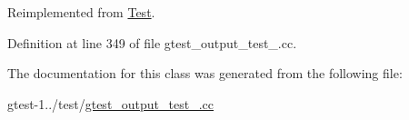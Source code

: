 \-Reimplemented from \hyperlink{classtesting_1_1Test_a931587596081ef8178c2b128facb0411}{\-Test}.



\-Definition at line 349 of file gtest\-\_\-output\-\_\-test\-\_\-.\-cc.




\-The documentation for this class was generated from the following file\-:\begin{DoxyCompactItemize}
\item 
gtest-\/1../test/\hyperlink{gtest__output__test___8cc}{gtest\-\_\-output\-\_\-test\-\_\-.\-cc}\end{DoxyCompactItemize}
